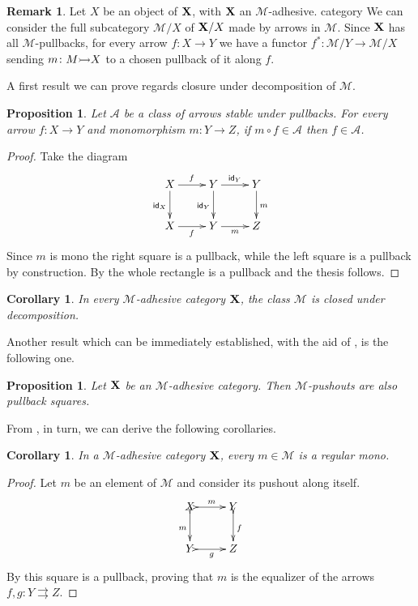 \documentclass[a4paper]{article}
\newcommand{\id}[1]{\mathsf{id}_{#1}}
\newcommand{\mto}[0]{\scalebox{1}{$\rightarrowtail$}}
\def\X{\textbf {\textup{X}}}
\def\Y{\textbf {\textup{Y}}}
\newtheorem{proposition}[theorem]{Proposition}
\newtheorem{corollary}[theorem]{Corollary}
\theoremstyle{definition}
\newtheorem{remark}[theorem]{Remark}
\begin{document}
\begin{remark}\label{rem:pb}
	Let $X$ be an object of $\X$, with $\X$ an $\mathcal{M}$-adhesive. category We can consider  the full subcategory $\mathcal{M}/X$ of $\X/X$ made by arrows in $\mathcal{M}$. Since $\X$ has all $\mathcal{M}$-pullbacks, for every arrow $f\colon X\to Y$ we have a functor $f^*\colon \mathcal{M}/Y\to \mathcal{M}/X $ sending $m\colon M \mto X$ to a chosen pullback of it along $f$.
	\end{remark}

A first result we can prove regards closure under decomposition of $\mathcal{M}$.

\begin{proposition}\label{prop:deco}Let  $\mathcal{A}$ be a class of arrows stable under pullbacks. For every arrow $f\colon X\to Y$ and monomorphism $m\colon Y\to Z$, if $m\circ f \in\mathcal{A}$ then $f\in \mathcal{A}$.
\end{proposition}
\begin{proof}Take the diagram
	\[\xymatrix{X \ar[d]_{\id{X}}\ar[r]^{f}& Y \ar[r]^{\id{Y}}  \ar[d]_{\id{Y}}& Y \ar[d]^{m}\\
		X \ar[r]_{f}& Y \ar[r]_{m} & Z}\]
	Since $m$ is mono the right square is a pullback, while the left square is a pullback by construction. By  the whole rectangle is a pullback and the thesis follows.
\end{proof}
\begin{corollary}\label{cor:deco}
	In every $\mathcal{M}$-adhesive category $\X$, the class $\mathcal{M}$ is closed under decomposition.
\end{corollary}

Another result which can be immediately established, with the aid of , is the following one.
\begin{proposition}\label{prop:pbpoad}
	Let $\X$ be an $\mathcal{M}$-adhesive category. Then $\mathcal{M}$-pushouts are also pullback squares.
\end{proposition}

From , in turn, we can derive the following corollaries.
\begin{corollary}\label{cor:rego}
	In a $\mathcal{M}$-adhesive category $\X$, every $m\in\mathcal{M}$ is a regular mono.
\end{corollary}
\begin{proof}
Let $m$ be an element of $\mathcal{M}$ and consider its pushout along itself.
\[\xymatrix{X\ar@{>->}[r]^m \ar@{>->}[d]_m& Y\ar@{>->}[d]^{f}\\Y \ar@{>->}[r]_g & Z}\]
By  this square is a pullback, proving that $m$ is the equalizer of the arrows $f,g\colon Y\rightrightarrows Z$. \qedhere 
\end{proof}
\end{document}
